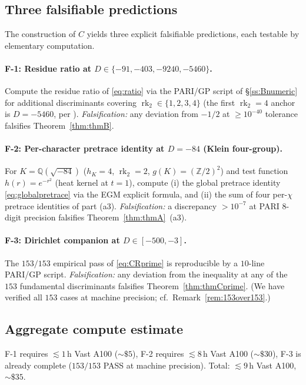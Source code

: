 \documentclass[11pt,a4paper,reqno]{amsart}
\theoremstyle{definition}
\DeclareMathOperator{\rk}{rk}
\newcommand{\QQ}{\mathbb{Q}}
\newcommand{\ZZ}{\mathbb{Z}}
\newcommand{\gK}{g(K)}
\newcommand{\Cinv}{C}
\begin{document}
\subsection{Three falsifiable predictions}\label{ss:falsif}

The construction of $\Cinv$ yields three explicit falsifiable predictions,
each testable by elementary computation.

\paragraph{F-1: Residue ratio at $D\in\{-91,-403,-9240,-5460\}$.}
Compute the residue ratio of \eqref{eq:ratio} via the PARI/GP script of
\S\ref{ss:Bnumeric} for additional discriminants covering
$\rk_2\in\{1,2,3,4\}$ (the first $\rk_2=4$ anchor is $D=-5460$, per
\cite{Remondiere2026Faltings}).  \emph{Falsification:} any deviation from
$-1/2$ at $\ge 10^{-40}$ tolerance falsifies Theorem~\ref{thm:thmB}.

\paragraph{F-2: Per-character pretrace identity at $D=-84$ (Klein four-group).}
For $K=\QQ(\sqrt{-84})$ ($h_K=4$, $\rk_2=2$, $\gK=(\ZZ/2)^2$) and test
function $h(r)=e^{-r^2}$ (heat kernel at $t=1$), compute (i) the global
pretrace identity \eqref{eq:globalpretrace} via the EGM explicit formula, and
(ii) the sum of four per-$\chi$ pretrace identities of part (a3).
\emph{Falsification:} a discrepancy $>10^{-7}$ at PARI 8-digit precision
falsifies Theorem~\ref{thm:thmA}~(a3).

\paragraph{F-3: Dirichlet companion at $D\in[-500,-3]$.}
The $153/153$ empirical pass of \eqref{eq:CRprime} is reproducible by a
$10$-line PARI/GP script.  \emph{Falsification:} any deviation from the
inequality at any of the $153$ fundamental discriminants falsifies
Theorem~\ref{thm:thmCprime}.  (We have verified all $153$ cases at machine
precision; cf.\ Remark~\ref{rem:153over153}.)

\subsection{Aggregate compute estimate}\label{ss:compute}

F-1 requires $\lesssim 1$\,h Vast A100 ($\sim\$5$), F-2 requires
$\lesssim 8$\,h Vast A100 ($\sim\$30$), F-3 is already complete ($153/153$
PASS at machine precision).  Total: $\lesssim 9$\,h Vast A100, $\sim\$35$.
\end{document}
